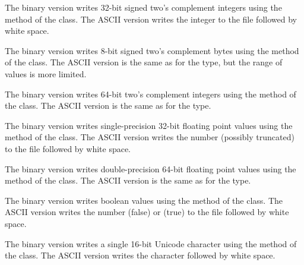 \begin{deflist}
\begin{itemdesc}
The binary version writes 32-bit signed two's complement integers using the
 method of the
 class. The ASCII version writes
the integer to the file followed by white space.
\end{itemdesc}

\begin{itemdesc}
The binary version writes 8-bit signed two's complement bytes using the
 method of the
 class. The ASCII version is the
same as for the  type, but the range of values is more
limited.
\end{itemdesc}

\begin{itemdesc}
The binary version writes 64-bit two's complement integers using the 
 method of the
 class. The ASCII version is the
same as for the  type.
\end{itemdesc}

\begin{itemdesc}
The binary version writes single-precision 32-bit floating point
values using the  method of the
 class. The ASCII version writes
the number (possibly truncated) to the file followed by white space.
\end{itemdesc}

\begin{itemdesc}
The binary version writes double-precision 64-bit floating point
values using the  method of the
 class. The ASCII version is the
same as for the  type.
\end{itemdesc}

\begin{itemdesc}
The binary version writes boolean values using the
 method of the
 class. The ASCII version writes
the number  (false) or  (true) to the file
followed by white space.
\end{itemdesc}

\begin{itemdesc}
The binary version writes a single 16-bit Unicode character using
the  method of the
 class. The ASCII version writes
the character followed by white space.
\end{itemdesc}


\end{deflist}
